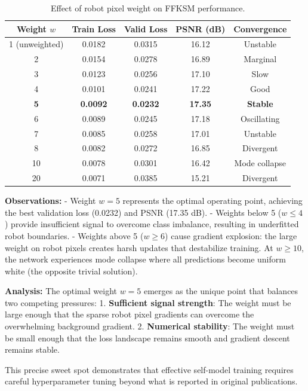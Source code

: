 ﻿\documentclass[12pt,a4paper,oneside]{report}
\begin{document}
\begin{table}[H]
\centering
\caption{Effect of robot pixel weight on FFKSM performance.}
\label{tab:weight_tuning}
\begin{tabular}{ccccc}
\toprule
Weight $w$ & Train Loss & Valid Loss & PSNR (dB) & Convergence \\
\midrule
1 (unweighted) & 0.0182 & 0.0315 & 16.12 & Unstable \\
2 & 0.0154 & 0.0278 & 16.89 & Marginal \\
3 & 0.0123 & 0.0256 & 17.10 & Slow \\
4 & 0.0101 & 0.0241 & 17.22 & Good \\
\textbf{5} & \textbf{0.0092} & \textbf{0.0232} & \textbf{17.35} & \textbf{Stable} \\
6 & 0.0089 & 0.0245 & 17.18 & Oscillating \\
7 & 0.0085 & 0.0258 & 17.01 & Unstable \\
8 & 0.0082 & 0.0272 & 16.85 & Divergent \\
10 & 0.0078 & 0.0301 & 16.42 & Mode collapse \\
20 & 0.0071 & 0.0385 & 15.21 & Divergent \\
\bottomrule
\end{tabular}
\end{table}

\textbf{Observations:}
- Weight $w = 5$ represents the optimal operating point, achieving the best validation loss (0.0232) and PSNR (17.35 dB).
- Weights below 5 ($w \leq 4$) provide insufficient signal to overcome class imbalance, resulting in underfitted robot boundaries.
- Weights above 5 ($w \geq 6$) cause gradient explosion: the large weight on robot pixels creates harsh updates that destabilize training. At $w \geq 10$, the network experiences mode collapse where all predictions become uniform white (the opposite trivial solution).

\textbf{Analysis:} The optimal weight $w = 5$ emerges as the unique point that balances two competing pressures:
1. \textbf{Sufficient signal strength}: The weight must be large enough that the sparse robot pixel gradients can overcome the overwhelming background gradient.
2. \textbf{Numerical stability}: The weight must be small enough that the loss landscape remains smooth and gradient descent remains stable.

This precise sweet spot demonstrates that effective self-model training requires careful hyperparameter tuning beyond what is reported in original publications.
\end{document}
